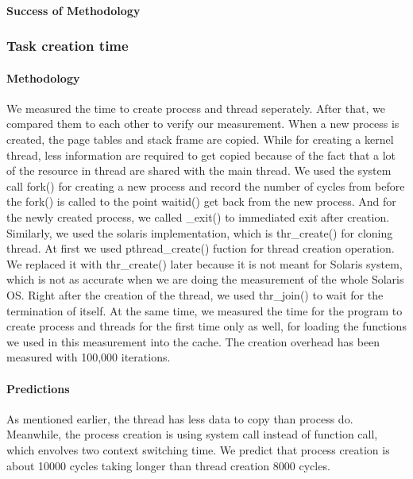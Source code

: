 \paragraph{Success of Methodology}


\subsubsection{Task creation time}
\paragraph{Methodology}
We measured the time to create process and thread seperately. After that, we compared them to each other to verify our measurement. When a new process is created, the page tables and stack frame are copied. While for creating a kernel thread, less information are required to get copied because of the fact that a lot of the resource in thread are shared with the main thread.
We used the system call fork() for creating a new process and record the number of cycles from before the fork() is called to the point waitid() get back from the new process. And for the newly created process, we called \_exit() to immediated exit after creation.
Similarly, we used the solaris implementation, which is thr\_create() for cloning thread. At first we used pthread\_create() fuction for thread creation operation. We replaced it with thr\_create() later because it is not meant for Solaris system, which is not as accurate when we are doing the measurement of the whole Solaris OS. Right after the creation of the thread, we used thr\_join() to wait for the termination of itself.
At the same time, we measured the time for the program to create process and threads for the first time only as well, for loading the functions we used in this measurement into the cache.
The creation overhead has been measured with 100,000 iterations.


\paragraph{Predictions}

As mentioned earlier, the thread has less data to copy than process do. Meanwhile, the process creation is using system call instead of function call, which envolves two context switching time. We predict that process creation is about 10000 cycles taking longer than thread creation 8000 cycles.







